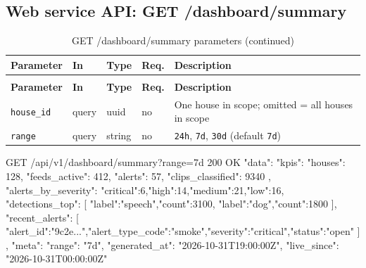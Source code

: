 \subsection{Web service API: GET /dashboard/summary}
\begin{longtable}{L{2.6cm}L{1.4cm}L{1.8cm}L{1.1cm}L{7.0cm}}
\caption{GET /dashboard/summary parameters}\\
\toprule
\textbf{Parameter} & \textbf{In} & \textbf{Type} & \textbf{Req.} & \textbf{Description} \\
\midrule
\endfirsthead
\caption[]{GET /dashboard/summary parameters (continued)}\\
\toprule
\textbf{Parameter} & \textbf{In} & \textbf{Type} & \textbf{Req.} & \textbf{Description} \\
\midrule
\endhead
\texttt{house\_id} & query & uuid & no & One house in scope; omitted = all houses in scope \\
\texttt{range} & query & string & no & \texttt{24h}, \texttt{7d}, \texttt{30d} (default \texttt{7d}) \\
\bottomrule
\end{longtable}
\begin{Shaded}
\begin{Code}
GET /api/v1/dashboard/summary?range=7d          200 OK
{ "data": { "kpis": { "houses": 128, "feeds_active": 412, "alerts": 57, "clips_classified": 9340 },
            "alerts_by_severity": {"critical":6,"high":14,"medium":21,"low":16},
            "detections_top": [ {"label":"speech","count":3100}, {"label":"dog","count":1800} ],
            "recent_alerts": [ {"alert_id":"9c2e...","alert_type_code":"smoke","severity":"critical","status":"open"} ] },
  "meta": { "range": "7d", "generated_at": "2026-10-31T19:00:00Z", "live_since": "2026-10-31T00:00:00Z" } }
\end{Code}
\end{Shaded}

